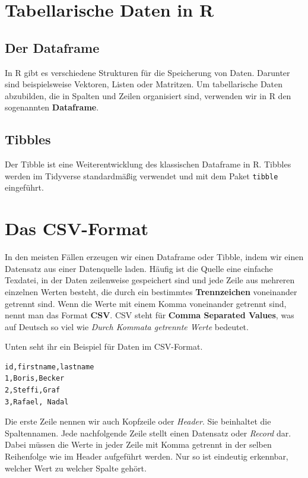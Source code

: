 \documentclass[
]{book}
\begin{document}
\hypertarget{tabellarische-daten-in-r}{%
\section{Tabellarische Daten in R}\label{tabellarische-daten-in-r}}

\hypertarget{der-dataframe}{%
\subsection{Der Dataframe}\label{der-dataframe}}

In R gibt es verschiedene Strukturen für die Speicherung von Daten. Darunter sind beispielsweise Vektoren, Listen oder Matritzen. Um tabellarische Daten abzubilden, die in Spalten und Zeilen organisiert sind, verwenden wir in R den sogenannten \textbf{Dataframe}.

\hypertarget{tibbles}{%
\subsection{Tibbles}\label{tibbles}}

Der Tibble ist eine Weiterentwicklung des klassischen Dataframe in R. Tibbles werden im Tidyverse standardmäßig verwendet und mit dem Paket \texttt{tibble} eingeführt.

\hypertarget{das-csv-format}{%
\section{Das CSV-Format}\label{das-csv-format}}

In den meisten Fällen erzeugen wir einen Dataframe oder Tibble, indem wir einen Datensatz aus einer Datenquelle laden. Häufig ist die Quelle eine einfache Texdatei, in der Daten zeilenweise gespeichert sind und jede Zeile aus mehreren einzelnen Werten besteht, die durch ein bestimmtes \textbf{Trennzeichen} voneinander getrennt sind. Wenn die Werte mit einem Komma voneinander getrennt sind, nennt man das Format \textbf{CSV}. CSV steht für \textbf{Comma Separated Values}, was auf Deutsch so viel wie \emph{Durch Kommata getrennte Werte} bedeutet.

Unten seht ihr ein Beispiel für Daten im CSV-Format.

\begin{verbatim}
id,firstname,lastname
1,Boris,Becker
2,Steffi,Graf
3,Rafael, Nadal
\end{verbatim}

Die erste Zeile nennen wir auch Kopfzeile oder \emph{Header}. Sie beinhaltet die Spaltennamen. Jede nachfolgende Zeile stellt einen Datensatz oder \emph{Record} dar. Dabei müssen die Werte in jeder Zeile mit Komma getrennt in der selben Reihenfolge wie im Header aufgeführt werden. Nur so ist eindeutig erkennbar, welcher Wert zu welcher Spalte gehört.
\end{document}
